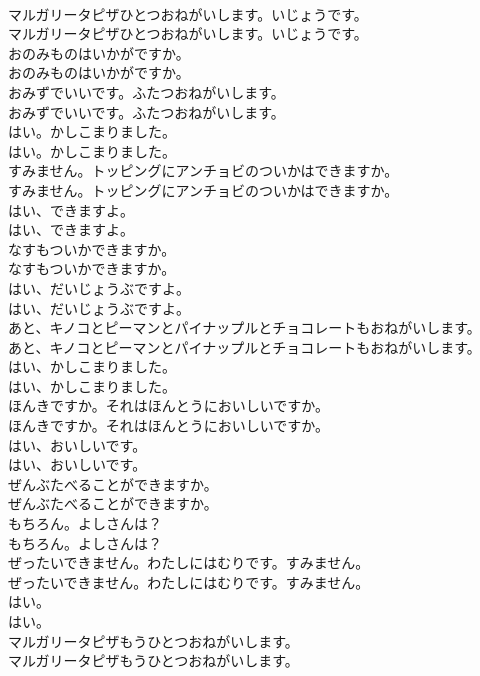 \documentclass[8pt]{extreport}
\begin{document}
\begin{CJK}{UTF8}{min}
\\	マルガリータピザひとつおねがいします。いじょうです。	
\\	マルガリータピザひとつおねがいします。いじょうです。 
\\	おのみものはいかがですか。	
\\	おのみものはいかがですか。 
\\	おみずでいいです。ふたつおねがいします。	
\\	おみずでいいです。ふたつおねがいします。 
\\	はい。かしこまりました。	
\\	はい。かしこまりました。 
\\	すみません。トッピングにアンチョビのついかはできますか。	
\\	すみません。トッピングにアンチョビのついかはできますか。 
\\	はい、できますよ。	
\\	はい、できますよ。 
\\	なすもついかできますか。	
\\	なすもついかできますか。 
\\	はい、だいじょうぶですよ。	
\\	はい、だいじょうぶですよ。 
\\	あと、キノコとピーマンとパイナップルとチョコレートもおねがいします。	
\\	あと、キノコとピーマンとパイナップルとチョコレートもおねがいします。 
\\	はい、かしこまりました。	
\\	はい、かしこまりました。 
\\	ほんきですか。それはほんとうにおいしいですか。	
\\	ほんきですか。それはほんとうにおいしいですか。 
\\	はい、おいしいです。	
\\	はい、おいしいです。 
\\	ぜんぶたべることができますか。	
\\	ぜんぶたべることができますか。 
\\	もちろん。よしさんは？	
\\	もちろん。よしさんは？ 
\\	ぜったいできません。わたしにはむりです。すみません。	
\\	ぜったいできません。わたしにはむりです。すみません。 
\\	はい。	
\\	はい。 
\\	マルガリータピザもうひとつおねがいします。	
\\	マルガリータピザもうひとつおねがいします。 

\end{CJK}
\end{document}
